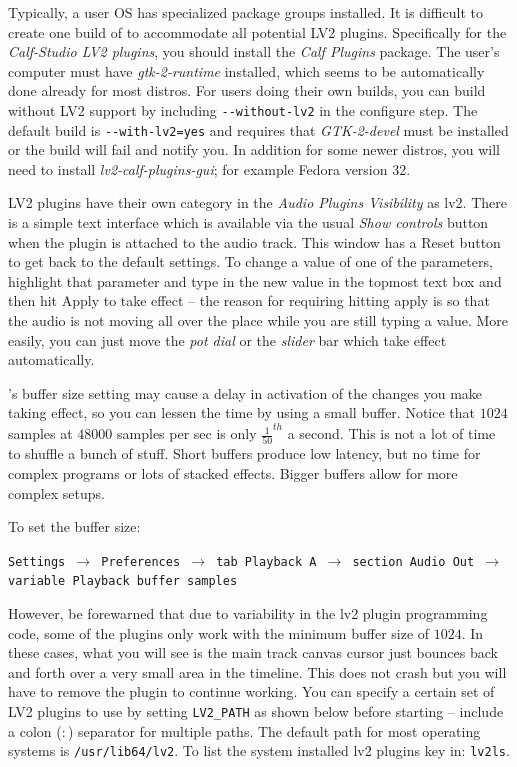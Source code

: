 Typically, a user OS has specialized package groups installed. It is difficult to create one build of \CGG{} to accommodate all potential LV2 plugins. Specifically for the \textit{Calf-Studio LV2 plugins}, you should install the \textit{Calf Plugins} package. 
The user’s computer must have \textit{gtk-2-runtime} installed, which seems to be automatically done already for most distros. For users doing their own builds, you can build \CGG{} without LV2 support by including \texttt{-{}-without-lv2} in the configure step. The default build is \texttt{-{}-with-lv2=yes} and requires that \textit{GTK-2-devel} must be installed or the build will fail and notify you. In addition for some newer distros, you will need to install
\textit{lv2-calf-plugins-gui}; for example Fedora version 32.

LV2 plugins have their own category in the \textit{Audio Plugins Visibility} as lv2. There is a simple text interface which is available via the usual \textit{Show controls} button when the plugin is attached to the audio track. This window has a Reset button to get back to the default settings. To change a value of one of the parameters, highlight that parameter and type in the new value in the topmost text box and then hit Apply to take effect -- the reason for requiring hitting apply is so that the audio is not moving all over the place while you are still typing a value. More easily, you can just move the \textit{pot dial} or the \textit{slider} bar which take effect automatically.

\CGG{}’s buffer size setting may cause a delay in activation of the changes you make taking effect, so you can lessen the time by using a small buffer. Notice that $1024$ samples at $48000$ samples per sec is only $\frac{1}{50}^{th}$ a second. This is not a lot of time to shuffle a bunch of stuff. Short buffers produce low latency, but no time for complex programs or lots of stacked effects. Bigger buffers allow for more complex setups.

To set the buffer size:

\texttt{Settings $\rightarrow$ Preferences $\rightarrow$ tab Playback A $\rightarrow$ section Audio Out $\rightarrow$ variable Playback buffer samples}

However, be forewarned that due to variability in the lv2 plugin programming code, some of the plugins only work with the minimum buffer size of $1024$. In these cases, what you will see is the main track canvas cursor just bounces back and forth over a very small area in the timeline. This does not crash \CGG{} but you will have to remove the plugin to continue working.
You can specify a certain set of LV2 plugins to use by setting \texttt{LV2\_PATH}  as shown below before starting \CGG{} -- include a colon ($:$) separator for multiple paths. The default path for most operating systems is \texttt{/usr/lib64/lv2}. To list the system installed lv2 plugins key in: \texttt{lv2ls}.

